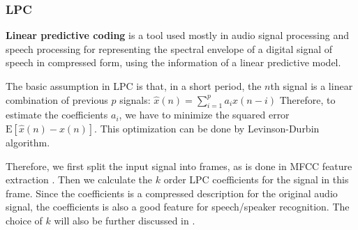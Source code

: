 \subsubsection{LPC}
\textbf{Linear predictive coding} is a tool used mostly in audio signal processing and speech
processing for representing the spectral envelope of a
digital signal of speech in compressed form, using the information of a linear predictive model.\cite{lpc}

The basic assumption in LPC is that,
    in a short period, the $n$th signal is a linear combination of previous $p$ signals:
    $ \hat{x}(n) = \sum_{i=1}^pa_i x(n-i)$
    Therefore, to estimate the coefficients $ a_i$, we have to minimize the squared error
    $ \text{E}\left[ \hat{x}(n) - x(n)\right]$.
    This optimization can be done by Levinson-Durbin algorithm.\cite{levinson-durbin}

    Therefore, we first split the input signal into frames, as is done in MFCC feature extraction .
    Then we calculate the $k$ order LPC coefficients for the signal in this frame.
    Since the coefficients is a compressed description for the original audio signal,
    the coefficients is also a good feature for speech/speaker recognition.
    The choice of $k$ will also be further discussed in .

